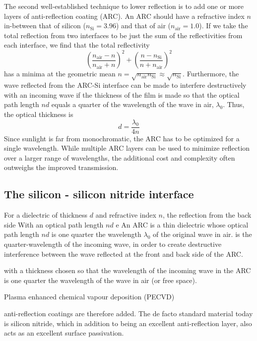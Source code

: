 \documentclass[11pt,bibliography=totoc,index=totoc]{scrbook}   %
\begin{document}
The second well-established technique to lower reflection is to add one or more layers of anti-reflection coating (ARC). 
An ARC should have a refractive index $n$ in-between that of silicon ($n_{\text{Si}}=3.96$) and that of air ($n_{\text{air}}=1.0$).
If we take the total reflection from two interfaces to be just the sum of the reflectivities from each interface, we find that
the total reflectivity
\begin{equation}
    \left(\frac{n_{\text{air}}-n}{n_{\text{air}}+n}\right)^2 + \left(\frac{n-n_{\text{Si}}}{n+n_{\text{air}}}\right)^2 
\end{equation}
has a minima at the geometric mean $n=\sqrt{n_{\text{air}}n_{\text{Si}}} \approx \sqrt{n_{\text{Si}}}$.
Furthermore, the wave reflected from the ARC-Si interface can be made to interfere destructively with an incoming wave if
the thickness of the film is made so that the optical path length $nd$ equals a quarter of the wavelength of the wave in air, $\lambda_0$.
Thus, the optical thickness is
\begin{equation}
  d = \frac{\lambda_0}{4n}
\end{equation}
Since sunlight is far from monochromatic, the ARC has to be optimized for a single wavelength.
While multiple ARC layers can be used to minimize reflection over a larger range of wavelengths, 
the additional cost and complexity often outweighs the improved transmission.

\subsection{The silicon - silicon nitride interface}

For a dielectric of thickness $d$ and refractive index $n$, the reflection from the back side 
With an optical path length $nd$ e
An ARC is a thin dielectric whose optical path length $nd$ is one quarter the wavelength $\lambda_0$ of the original wave in air.
is the quarter-wavelength of the incoming wave, in order to create 
destructive interference between the wave reflected at the front and back side of the ARC.

with a thickness chosen so that the wavelength of the incoming wave in the ARC is one quarter the wavelength of the wave in air (or free space). 

Plasma enhanced chemical vapour deposition (PECVD)\cite{Hoex:2005}

anti-reflection coatings are therefore added. 
The de facto standard material today is silicon nitride, which in addition to being an excellent anti-reflection layer, also acts as an excellent surface passivation. 
\end{document}
